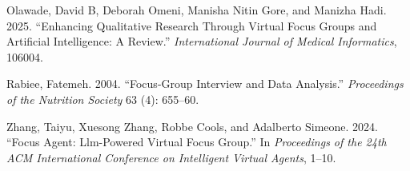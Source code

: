 \documentclass[
  letterpaper,
  DIV=11,
  numbers=noendperiod]{scrartcl}
\newlength{\cslhangindent}
\newenvironment{CSLReferences}[2] %
 {\begin{list}{}{%
  \setlength{\itemindent}{0pt}
  \setlength{\leftmargin}{0pt}
  \setlength{\parsep}{0pt}
  \ifodd #1
   \setlength{\leftmargin}{\cslhangindent}
   \setlength{\itemindent}{-1\cslhangindent}
  \fi
  \setlength{\itemsep}{#2\baselineskip}}}
 {\end{list}}
\begin{document}
\begin{CSLReferences}{1}{0}
Olawade, David B, Deborah Omeni, Manisha Nitin Gore, and Manizha Hadi.
2025. {``Enhancing Qualitative Research Through Virtual Focus Groups and
Artificial Intelligence: A Review.''} \emph{International Journal of
Medical Informatics}, 106004.

Rabiee, Fatemeh. 2004. {``Focus-Group Interview and Data Analysis.''}
\emph{Proceedings of the Nutrition Society} 63 (4): 655--60.

Zhang, Taiyu, Xuesong Zhang, Robbe Cools, and Adalberto Simeone. 2024.
{``Focus Agent: Llm-Powered Virtual Focus Group.''} In \emph{Proceedings
of the 24th ACM International Conference on Intelligent Virtual Agents},
1--10.

\end{CSLReferences}
\end{document}
